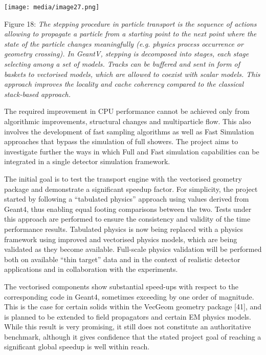 \documentclass[12pt,a4paper]{article}
\begin{document}
\texttt{[image: media/image27.png]}

Figure 18: \emph{The stepping procedure in particle transport is the
sequence of actions allowing to propagate a particle from a starting
point to the next point where the state of the particle changes
meaningfully (e.g. physics process occurrence or geometry crossing). In
GeantV, stepping is decomposed into stages, each stage selecting among a
set of models. Tracks can be buffered and sent in form of baskets to
vectorised models, which are allowed to coexist with scalar models. This
approach improves the locality and cache coherency compared to the
classical stack-based approach.}

The required improvement in CPU performance cannot be achieved only from
algorithmic improvements, structural changes and multiparticle flow.
This also involves the development of fast sampling algorithms as well
as Fast Simulation approaches that bypass the simulation of full
showers. The project aims to investigate further the ways in which Full
and Fast simulation capabilities can be integrated in a single detector
simulation framework.

The initial goal is to test the transport engine with the vectorised
geometry package and demonstrate a significant speedup factor. For
simplicity, the project started by following a ``tabulated physics''
approach using values derived from Geant4, thus enabling equal footing
comparisons between the two. Tests under this approach are performed to
ensure the consistency and validity of the time performance results.
Tabulated physics is now being replaced with a physics framework using
improved and vectorised physics models, which are being validated as
they become available. Full-scale physics validation will be performed
both on available ``thin target'' data and in the context of realistic
detector applications and in collaboration with the experiments.

The vectorised components show substantial speed-ups with respect to the
corresponding code in Geant4, sometimes exceeding by one order of
magnitude. This is the case for certain solids within the VecGeom
geometry package {[}41{]}, and is planned to be extended to field
propagators and certain EM physics models. While this result is very
promising, it still does not constitute an authoritative benchmark,
although it gives confidence that the stated project goal of reaching a
significant global speedup is well within reach.
\end{document}
